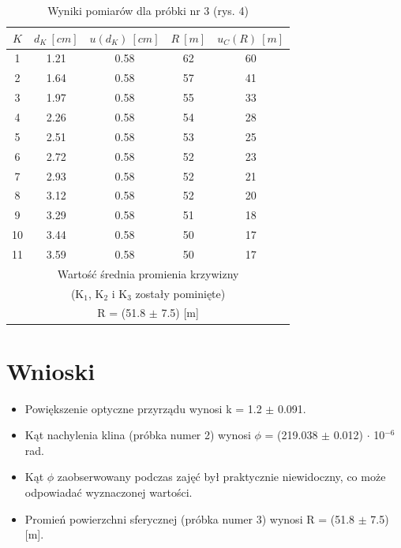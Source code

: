 \documentclass[12pt, a4paper, oneside]{article}
\begin{document}
\begin{table}[h]
  \centering
  \caption{Wyniki pomiarów dla próbki nr 3 (rys. 4)}
    \begin{tabular}{|c|c|c|c|c|}\hline
    $K$ & $d_K~[cm]$ & $u(d_K)~[cm]$ & $R~[m]$ & $u_C(R) ~[m]$ \\\hline
    1 & 1.21 & 0.58 & 62 & 60 \\\hline
    2 & 1.64 & 0.58 & 57 & 41 \\\hline
    3 & 1.97 & 0.58 & 55 & 33 \\\hline
    4 & 2.26 & 0.58 & 54 & 28 \\\hline
    5 & 2.51 & 0.58 & 53 & 25 \\\hline
    6 & 2.72 & 0.58 & 52 & 23 \\\hline
    7 & 2.93 & 0.58 & 52 & 21 \\\hline
    8 & 3.12 & 0.58 & 52 & 20 \\\hline
    9 & 3.29 & 0.58 & 51 & 18 \\\hline
    10 & 3.44 & 0.58 & 50 & 17 \\\hline
    11 & 3.59 & 0.58 & 50 & 17 \\\hline
    \multicolumn{5}{|c|}{Wartość średnia promienia krzywizny} \\\hline
    \multicolumn{5}{|c|}{(K$_1$, K$_2$ i K$_3$ zostały pominięte)} \\\hline
    \multicolumn{5}{|c|}{R = (51.8 $\pm$ 7.5) [m]} \\\hline
    \end{tabular}%
  \label{tab:addlabel}%
\end{table}%

\section{Wnioski}
\begin{itemize}
\item Powiększenie optyczne przyrządu wynosi k = 1.2 $\pm$ 0.091.
\item Kąt nachylenia klina (próbka numer 2) wynosi $\phi$ = (219.038 $\pm$ 0.012) $\cdot$ 10$^{-6}$ rad.
\item Kąt $\phi$ zaobserwowany podczas zajęć był praktycznie niewidoczny, co może odpowiadać wyznaczonej wartości.
\item Promień powierzchni sferycznej (próbka numer 3) wynosi R = (51.8 $\pm$ 7.5) [m].

\end{itemize}
\end{document}
